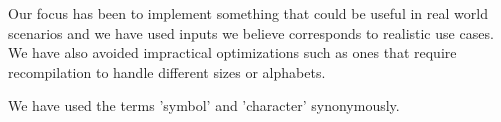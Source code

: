 Our focus has been to implement something that could be useful in real world scenarios and we have used inputs we believe corresponds to realistic use cases.
We have also avoided impractical optimizations such as ones that require recompilation to handle different sizes or alphabets.

We have used the terms 'symbol' and 'character' synonymously.